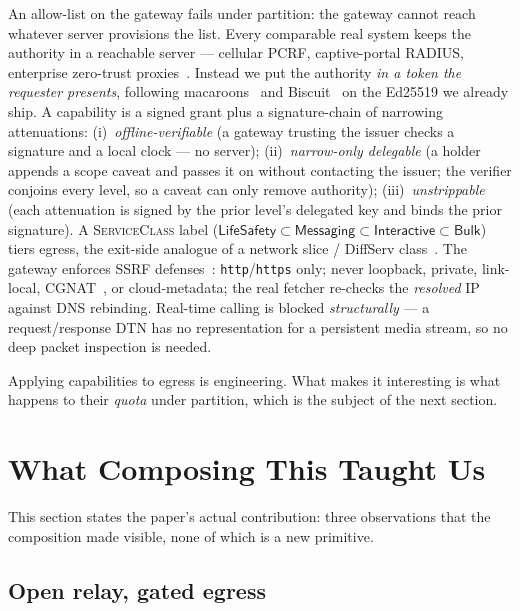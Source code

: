 \documentclass[11pt]{article}
\begin{document}
An allow-list on the gateway fails under partition: the gateway cannot reach
whatever server provisions the list. Every comparable real system keeps the
authority in a reachable server --- cellular PCRF, captive-portal RADIUS,
enterprise zero-trust proxies~\cite{rose2020ztarch}. Instead we put the authority
\emph{in a token the requester presents}, following
macaroons~\cite{birgisson2014macaroons} and Biscuit~\cite{biscuit2021} on the
Ed25519 we already ship. A capability is a signed grant plus a signature-chain of
narrowing attenuations: (i)~\emph{offline-verifiable} (a gateway trusting the
issuer checks a signature and a local clock --- no server); (ii)~\emph{narrow-only
delegable} (a holder appends a scope caveat and passes it on without contacting
the issuer; the verifier conjoins every level, so a caveat can only remove
authority); (iii)~\emph{unstrippable} (each attenuation is signed by the prior
level's delegated key and binds the prior signature). A \textsc{ServiceClass}
label ($\textsf{LifeSafety}\!\subset\!\textsf{Messaging}\!\subset\!\textsf{Interactive}
\!\subset\!\textsf{Bulk}$) tiers egress, the exit-side analogue of a network
slice / DiffServ class~\cite{rfc2475,foukas2017slicing}. The gateway enforces SSRF
defenses~\cite{owasp_ssrf}: \texttt{http}/\texttt{https} only; never loopback,
private, link-local, CGNAT~\cite{rfc6598}, or cloud-metadata; the real fetcher
re-checks the \emph{resolved} IP against DNS rebinding. Real-time calling is
blocked \emph{structurally} --- a request/response DTN has no representation for a
persistent media stream, so no deep packet inspection is needed.

Applying capabilities to egress is engineering. What makes it interesting is what
happens to their \emph{quota} under partition, which is the subject of the next
section.

\section{What Composing This Taught Us}\label{sec:obs}

This section states the paper's actual contribution: three observations that the
composition made visible, none of which is a new primitive.

\subsection{Open relay, gated egress}\label{sub:asymmetry}
\end{document}
